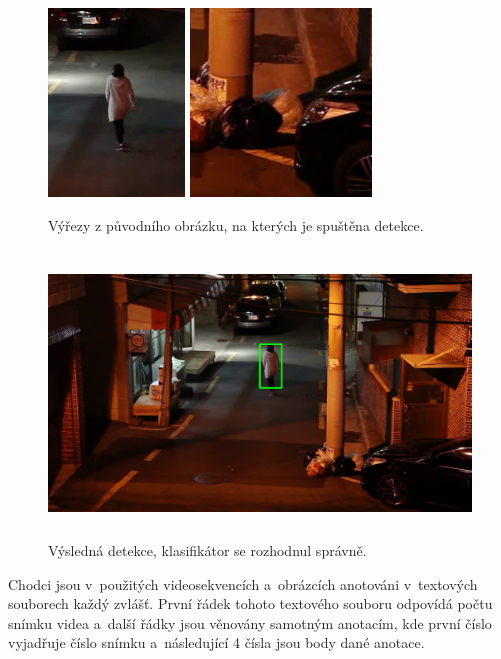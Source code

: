 \begin{figure}[H]
\centering
\includegraphics[keepaspectratio, max height=5cm,]{figures/mog/2}%
\vspace{0.0001cm}
\centering
\includegraphics[keepaspectratio, max height=5cm,]{figures/mog/1}%
\caption{Výřezy z původního obrázku, na kterých je spuštěna detekce.}
\label{fig:mogExample2}
\end{figure}
\begin{figure}[H]
\centering
\includegraphics[keepaspectratio, max height=7.6cm,]{figures/mog/detect}%
\caption{Výsledná detekce, klasifikátor se rozhodnul správně.}
\label{fig:mogExample3}
\end{figure}
 Chodci jsou v~použitých videosekvencích a~obrázcích anotováni v~textových souborech každý zvlášť. První řádek tohoto textového souboru odpovídá počtu snímku videa a~další řádky jsou věnovány samotným anotacím, kde první číslo vyjadřuje číslo snímku a~následující 4 čísla jsou body dané anotace.

